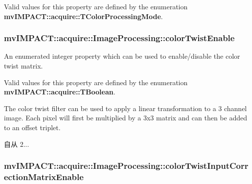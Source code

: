 Valid values for this property are defined by the enumeration {\bfseries mv\+I\+M\+P\+A\+C\+T\+::acquire\+::\+T\+Color\+Processing\+Mode}. \hypertarget{classmv_i_m_p_a_c_t_1_1acquire_1_1_image_processing_a070473c70f0ee8047c89db923747b8f2}{
\subsubsection[{color\+Twist\+Enable}]{ mv\+I\+M\+P\+A\+C\+T\+::acquire\+::\+Image\+Processing\+::color\+Twist\+Enable}}\label{classmv_i_m_p_a_c_t_1_1acquire_1_1_image_processing_a070473c70f0ee8047c89db923747b8f2}


An enumerated integer property which can be used to enable/disable the color twist matrix. 

Valid values for this property are defined by the enumeration {\bfseries mv\+I\+M\+P\+A\+C\+T\+::acquire\+::\+T\+Boolean}.

The color twist filter can be used to apply a linear transformation to a 3 channel image. Each pixel will first be multiplied by a 3x3 matrix and can then be added to an offset triplet.

\begin{DoxySince}{自从}
2... 
\end{DoxySince}
\hypertarget{classmv_i_m_p_a_c_t_1_1acquire_1_1_image_processing_a1059eb40d65d1ec9c66f5f0002b350c6}{
\subsubsection[{color\+Twist\+Input\+Correction\+Matrix\+Enable}]{ mv\+I\+M\+P\+A\+C\+T\+::acquire\+::\+Image\+Processing\+::color\+Twist\+Input\+Correction\+Matrix\+Enable}}\label{classmv_i_m_p_a_c_t_1_1acquire_1_1_image_processing_a1059eb40d65d1ec9c66f5f0002b350c6}


